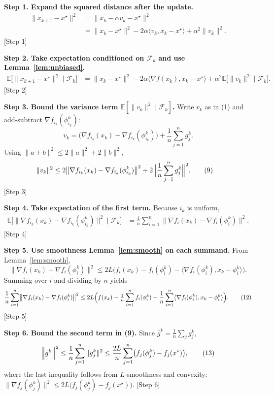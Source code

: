\documentclass{article}
\begin{document}
\noindent\textbf{Step 1. Expand the squared distance after the update.}
\[
\begin{aligned}
\|x_{k+1}-x^\star\|^2
&=\|x_k-\alpha v_k-x^\star\|^2\\
&=\|x_k-x^\star\|^2-2\alpha\langle v_k,x_k-x^\star\rangle+\alpha^2\|v_k\|^2. \tag{7}
\end{aligned}
\]
[Step 1]

\noindent\textbf{Step 2. Take expectation conditioned on $\mathcal{F}_k$ and use Lemma~\ref{lem:unbiased}.}
\[
\begin{aligned}
\mathbb{E}\!\bigl[\|x_{k+1}-x^\star\|^2\mid\mathcal{F}_k\bigr]
&=\|x_k-x^\star\|^2-2\alpha\langle\nabla f(x_k),x_k-x^\star\rangle
  +\alpha^2\mathbb{E}\!\bigl[\|v_k\|^2\mid\mathcal{F}_k\bigr]. \tag{8}
\end{aligned}
\]
[Step 2]

\noindent\textbf{Step 3. Bound the variance term $\mathbb{E}[\|v_k\|^2\mid\mathcal{F}_k]$.}
Write $v_k$ as in (1) and add‑subtract $\nabla f_{i_k}(\phi_{i_k}^k)$:
\[
v_k = \bigl(\nabla f_{i_k}(x_k)-\nabla f_{i_k}(\phi_{i_k}^k)\bigr)
      +\frac{1}{n}\sum_{j=1}^{n} g_j^k .
\]
Using $\|a+b\|^2\le 2\|a\|^2+2\|b\|^2$,
\[
\begin{aligned}
\|v_k\|^2
&\le 2\bigl\|\nabla f_{i_k}(x_k)-\nabla f_{i_k}(\phi_{i_k}^k)\bigr\|^2
   +2\Bigl\|\frac{1}{n}\sum_{j=1}^{n} g_j^k\Bigr\|^2 .\tag{9}
\end{aligned}
\]
[Step 3]

\noindent\textbf{Step 4. Take expectation of the first term.}
Because $i_k$ is uniform,
\[
\begin{aligned}
\mathbb{E}\!\bigl[\bigl\|\nabla f_{i_k}(x_k)-\nabla f_{i_k}(\phi_{i_k}^k)\bigr\|^2\mid\mathcal{F}_k\bigr]
&=\frac{1}{n}\sum_{i=1}^{n}
   \bigl\|\nabla f_i(x_k)-\nabla f_i(\phi_i^k)\bigr\|^2 .\tag{10}
\end{aligned}
\]
[Step 4]

\noindent\textbf{Step 5. Use smoothness Lemma~\ref{lem:smooth} on each summand.}
From Lemma~\ref{lem:smooth},
\[
\bigl\|\nabla f_i(x_k)-\nabla f_i(\phi_i^k)\bigr\|^2
\le 2L\bigl(f_i(x_k)-f_i(\phi_i^k)-\langle\nabla f_i(\phi_i^k),x_k-\phi_i^k\rangle\bigr). \tag{11}
\]
Summing over $i$ and dividing by $n$ yields
\[
\frac{1}{n}\sum_{i=1}^{n}
\bigl\|\nabla f_i(x_k)-\nabla f_i(\phi_i^k)\bigr\|^2
\le 2L\Bigl( f(x_k)-\tfrac{1}{n}\sum_{i=1}^{n}f_i(\phi_i^k)
          -\frac{1}{n}\sum_{i=1}^{n}\langle\nabla f_i(\phi_i^k),x_k-\phi_i^k\rangle\Bigr). \tag{12}
\]
[Step 5]

\noindent\textbf{Step 6. Bound the second term in (9).}
Since $\bar g^k=\frac1n\sum_{j}g_j^k$,
\[
\Bigl\|\bar g^k\Bigr\|^2 \le \frac{1}{n}\sum_{j=1}^{n}\|g_j^k\|^2
   \le \frac{2L}{n}\sum_{j=1}^{n}\bigl(f_j(\phi_j^k)-f_j(x^\star)\bigr), \tag{13}
\]
where the last inequality follows from $L$‑smoothness and convexity:
$\| \nabla f_j(\phi_j^k)\|^2\le 2L\bigl(f_j(\phi_j^k)-f_j(x^\star)\bigr)$.
[Step 6]
\end{document}
